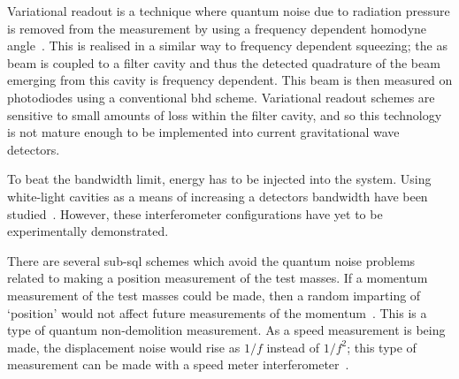 \par
Variational readout is a technique where quantum noise due to radiation pressure is removed from the measurement by using a frequency dependent homodyne angle~\cite{Kimble2001}. This is realised in a similar way to frequency dependent squeezing; the \gls{as} beam is coupled to a filter cavity and thus the detected quadrature of the beam emerging from this cavity is frequency dependent. This beam is then measured on photodiodes using a conventional \gls{bhd} scheme. Variational readout schemes are sensitive to small amounts of loss within the filter cavity, and so this technology is not mature enough to be implemented into current gravitational wave detectors.
\par
To beat the bandwidth limit, energy has to be injected into the system. Using white-light cavities as a means of increasing a detectors bandwidth have been studied~\cite{Bentley2019,Miao2015,Li_unpublished}. However, these interferometer configurations have yet to be experimentally demonstrated.
\par
There are several sub-\gls{sql} schemes which avoid the quantum noise problems related to making a position measurement of the test masses. If a momentum measurement of the test masses could be made, then a random imparting of `position' would not affect future measurements of the momentum~\cite{Braginsky547}. This is a type of quantum non-demolition measurement. As a speed measurement is being made, the displacement noise would rise as $1/f$ instead of $1/f^2$; this type of measurement can be made with a speed meter interferometer~\cite{Purdue2002,Zhang2018,Huttner2020}.
